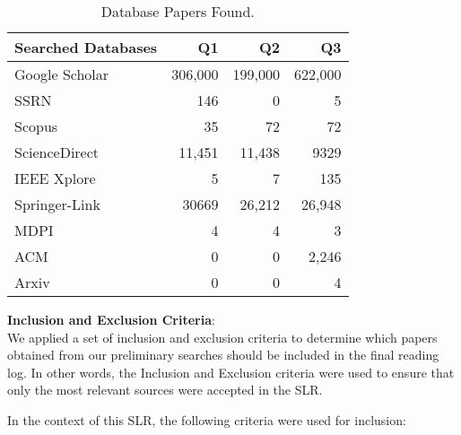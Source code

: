 \documentclass[11pt]{article}
\begin{document}
\begin{table}
\caption{Database Papers Found. 
}
\label{T:searchQueriesResults}

    \begin{tabularx}{\linewidth}{X r r r}
    \toprule

    \textbf{Searched Databases} &  \textbf{Q1} & \textbf{Q2} & \textbf{Q3}   \\
    
    \midrule
    
    Google Scholar & 306,000 & 199,000 & 622,000   \\
    SSRN & 146 & 0 & 5  \\
    Scopus & 35 & 72 & 72  \\
    ScienceDirect & 11,451 & 11,438 & 9329 \\
    IEEE Xplore & 5 & 7 & 135  \\
    Springer-Link & 30669 & 26,212 & 26,948  \\
    MDPI & 4 & 4 & 3 \\
    ACM & 0 & 0 & 2,246 \\
    Arxiv & 0 & 0 & 4 \\
    
    \bottomrule

    \end{tabularx}
\end{table}

\textbf{Inclusion and Exclusion Criteria}:\\ \label{S:criteria}
We applied a set of inclusion and exclusion criteria to determine which papers obtained from our preliminary searches should be included in the final reading log. In other words, the Inclusion and Exclusion criteria were used to ensure that only the most relevant sources were accepted in the SLR. 

 In the context of this SLR, the following criteria were used for inclusion:
\end{document}
